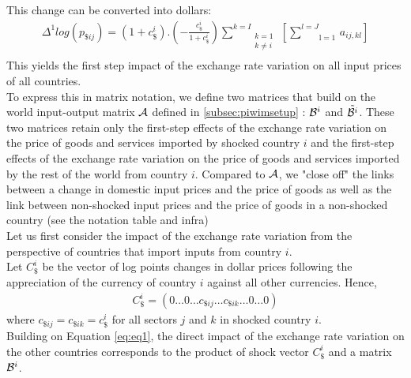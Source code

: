 \documentclass[11pt,a4paper]{paper} %
\begin{document}
This change can be converted into dollars: \\
\begin{eqnarray}
\Delta^1 log(p_{\$ij})=\left(1+c_\$^i\right).\left(-\frac{c_\$^i}{1+c_\$^i}\right)\underset{\begin{matrix}k=1\\k\neq i\\\end{matrix}}{\overset{{k}={I}}{\mathop\sum}}\,\left[\underset{\text{l}=1}{\overset{{l}={J}}{\mathop\sum}}\,{{{a}}_{ij,kl}}\right] 
\label{eq:eq2}
\end{eqnarray}
This yields the first step impact of the exchange rate variation on all input prices of all countries.\\
To express this in matrix notation, we define two matrices that build on the world input-output matrix $\cal A$ defined in \ref{subsec:piwimsetup} : ${{\cal B}^i}$ and ${\tilde{{\cal B}^i}}$. 
These two matrices retain only the first-step effects of the exchange rate variation on the price of goods and services imported by shocked country $i$ and the first-step effects of the exchange rate variation on the price of goods and services imported by the rest of the world from country $i$. 
Compared to $\cal A$, we "close off" the links between a change in domestic input prices and the price of goods as well as the link between non-shocked input prices and the price of goods in a non-shocked country (see the notation table and infra)\\
Let us first consider the impact of the exchange rate variation from the perspective of countries that import inputs from country $i$.\\
Let $C_\$^i$ be the vector of log points changes in dollar prices following the 
appreciation of the currency of country $i$ against all other currencies.
Hence,
\begin{eqnarray*}
C_\$^i=\left(0\ldots0\ldots c_{\$ij}\ldots c_{\$ik}\dots 0\ldots0\right)
\end{eqnarray*}
where $c_{\$ij}=c_{\$ik}=c_\$^i
$
for all sectors $j$ and $k$ in shocked country $i$.\\
Building on Equation \ref{eq:eq1}, the direct impact of the exchange rate variation on the other countries corresponds to the product of shock vector $C_\$^i$ and a matrix ${\cal B}^i$. 
\end{document}
